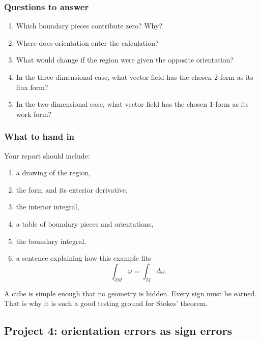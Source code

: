 \subsubsection*{Questions to answer}

\begin{enumerate}
\item Which boundary pieces contribute zero?  Why?

\item Where does orientation enter the calculation?

\item What would change if the region were given the opposite orientation?

\item In the three-dimensional case, what vector field has the chosen \(2\)-form as its
flux form?

\item In the two-dimensional case, what vector field has the chosen \(1\)-form as its
work form?
\end{enumerate}

\subsubsection*{What to hand in}

Your report should include:

\begin{enumerate}
\item a drawing of the region,

\item the form and its exterior derivative,

\item the interior integral,

\item a table of boundary pieces and orientations,

\item the boundary integral,

\item a sentence explaining how this example fits
\[
    \int_{\partial M}\omega=\int_Md\omega.
\]
\end{enumerate}

A cube is simple enough that no geometry is hidden.  Every sign must be earned.  That is
why it is such a good testing ground for Stokes' theorem.

\subsection{Project 4: orientation errors as sign errors}

